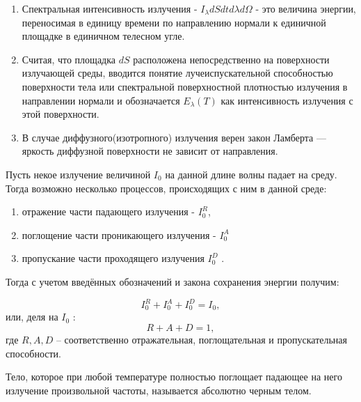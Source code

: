 \documentclass[a4paper]{article}
\begin{document}
\begin{enumerate}
    \item Спектральная интенсивность излучения - $I_\lambda dS dt d\lambda d\Omega$ - это величина энергии, переносимая в единицу времени по направлению нормали к единичной площадке в единичном телесном угле.
    \item Считая, что площадка $dS$ расположена непосредственно на поверхности излучающей среды, вводится понятие лучеиспускательной способностью поверхности тела или спектральной поверхностной плотностью излучения в направлении нормали и обозначается $E_\lambda(T)$ как интенсивность излучения с этой поверхности.
    \item В случае диффузного(изотропного) излучения верен закон Ламберта — яркость диффузной поверхности не зависит от направления.
\end{enumerate}

\vspace{0.3cm}

Пусть некое излучение величиной $I_0$ на данной длине волны падает на среду. Тогда возможно несколько процессов, происходящих
с ним в данной среде:

\begin{enumerate}
    \item отражение части падающего излучения - $I^R_0$,
    \item поглощение части проникающего излучения - $I^A_0$
    \item пропускание части проходящего излучения $I^D_0$ .
\end{enumerate}

Тогда с учетом введённых обозначений и закона сохранения
энергии получим:

$$ I^R_0 + I^A_0 + I^D_0 = I_0, $$
или, деля на $I_0$ :
$$ R+A+D=1, $$
где $R, A, D$ – соответственно отражательная, поглощательная и пропускательная способности. \par
Тело, которое при любой температуре полностью поглощает падающее на него излучение произвольной частоты, называется абсолютно черным телом. \par
\end{document}
